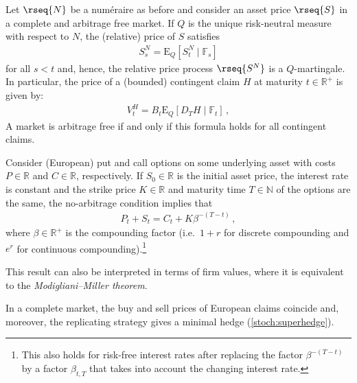     \begin{property}
        Let $\rseq{N}$ be a num\'eraire as before and consider an asset price $\rseq{S}$ in a complete and arbitrage free market. If $Q$ is the unique risk-neutral measure with respect to $N$, the (relative) price of $S$ satisfies
        \begin{gather}
            S_s^N = \mathrm{E}_Q[S_t^N\mid\mathbb{F}_s]
        \end{gather}
        for all $s<t$ and, hence, the relative price process $\rseq{S^N}$ is a $Q$-martingale. In particular, the price of a (bounded) contingent claim $H$ at maturity $t\in\mathbb{R}^+$ is given by:
        \begin{gather}
            V_t^H = B_t\mathrm{E}_Q[D_TH\mid\mathbb{F}_t]\,,
        \end{gather}
        A market is arbitrage free if and only if this formula holds for all contingent claims.
    \end{property}

    \begin{result}
        Consider (European) put and call options on some underlying asset with costs $P\in\mathbb{R}$ and $C\in\mathbb{R}$, respectively. If $S_0\in\mathbb{R}$ is the initial asset price, the interest rate is constant and the strike price $K\in\mathbb{R}$ and maturity time $T\in\mathbb{N}$ of the options are the same, the no-arbitrage condition implies that
        \begin{gather}
            P_t+S_t = C_t + K\beta^{-(T-t)}\,,
        \end{gather}
        where $\beta\in\mathbb{R}^+$ is the compounding factor (i.e.~$1+r$ for discrete compounding and $e^r$ for continuous compounding).\footnote{This also holds for risk-free interest rates after replacing the factor $\beta^{-(T-t)}$ by a factor $\beta_{t,T}$ that takes into account the changing interest rate.}
    \end{result}
    \begin{remark}
        This result can also be interpreted in terms of firm values, where it is equivalent to the \textit{Modigliani--Miller theorem}.
    \end{remark}

    \begin{property}
        In a complete market, the buy and sell prices of European claims coincide and, moreover, the replicating strategy gives a minimal hedge (\cref{stoch:superhedge}).
    \end{property}

